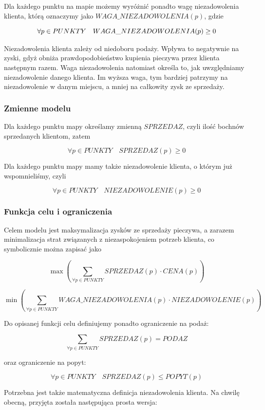 \documentclass[]{article}
\begin{document}
Dla każdego punktu na mapie możemy wyróżnić ponadto wagę niezadowolenia klienta, którą oznaczymy jako $WAGA\_NIEZADOWOLENIA(p)$, gdzie

\[ {\Large \forall} p \in PUNKTY \quad WAGA\_NIEZADOWOLENIA(p) \geq 0 \]

Niezadowolenia klienta zależy od niedoboru podaży. Wpływa to negatywnie na zyski, gdyż obniża prawdopodobieństwo kupienia pieczywa przez klienta następnym razem. Waga niezadowolenia natomiast określa to, jak uwzględniamy niezadowolenie danego klienta. Im wyższa waga, tym bardziej patrzymy na niezadowolenie w danym miejscu, a mniej na całkowity zysk ze sprzedaży.

\subsubsection{Zmienne modelu}

Dla każdego punktu mapy określamy zmienną $SPRZEDAZ$, czyli ilość bochnów sprzedanych klientom, zatem

\[ \forall p \in PUNKTY \quad SPRZEDAZ(p) \geq 0 \]

Dla każdego punktu mapy mamy także niezadowolenie klienta, o którym już wspomnieliśmy, czyli 

\[ \forall p \in PUNKTY \quad NIEZADOWOLENIE(p) \geq 0 \]

\subsubsection{Funkcja celu i ograniczenia}

Celem modelu jest maksymalizacja zysków ze sprzedaży pieczywa, a zarazem minimalizacja strat związanych z niezaspokojeniem potrzeb klienta, co symbolicznie można zapisać jako

\[
\max \left( \sum_{\forall p \in PUNKTY} SPRZEDAZ(p) \cdot CENA(p) \right)
\]

\[
\min \left( \sum_{\forall p \in PUNKTY} WAGA\_NIEZADOWOLENIA(p) \cdot NIEZADOWOLENIE(p) \right)
\]

Do opisanej funkcji celu definiujemy ponadto ograniczenie na podaż:

\[
\sum_{\forall p \in PUNKTY} SPRZEDAZ(p) = PODAZ
\]

oraz ograniczenie na popyt:

\[
\forall p \in PUNKTY \quad SPRZEDAZ(p) \leq POPYT(p)
\]

Potrzebna jest także matematyczna definicja niezadowolenia klienta. Na chwilę obecną, przyjęta została następująca prosta wersja:
\end{document}

